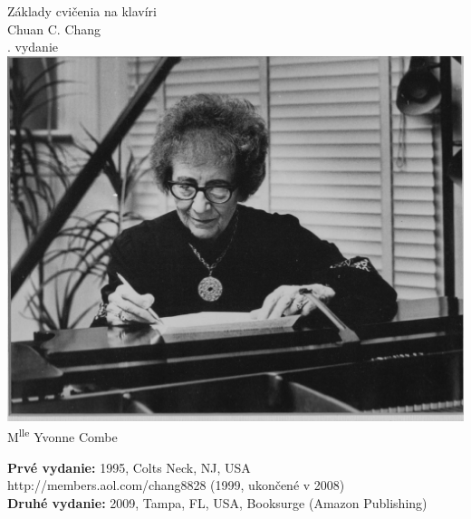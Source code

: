 \documentclass[11pt,a4paper]{book}
\begin{document}
\frontmatter
{}\setcounter{page}{1}%
\pagestyle{empty}
\begin{titlepage}
\begin{center}
{\noindent\fontsize{40pt}{40pt}\selectfont Základy cvičenia na klavíri}\\
\vspace*{6em}
{\fontsize{30pt}{30pt}\selectfont Chuan C. Chang}\\
\vspace*{8em}
{\noindent\fontsize{30pt}{30pt}. vydanie}\\
\vspace*{8em}
\includegraphics[scale=0.15]{figures/CombePhoto.jpg}\\
\vspace*{0.5em}
{\fontsize{16pt}{16pt}\selectfont M\textsuperscript{lle} Yvonne Combe}\\
\end{center}
\vfill %
\end{titlepage}
\noindent \textbf{Prvé vydanie:} 1995, Colts Neck, NJ, USA\\
http://members.aol.com/chang8828 (1999, ukončené v 2008)
\vspace*{2em}\\
\noindent \textbf{Druhé vydanie:} 2009, Tampa, FL, USA, Booksurge (Amazon Publishing)\\
\end{document}
